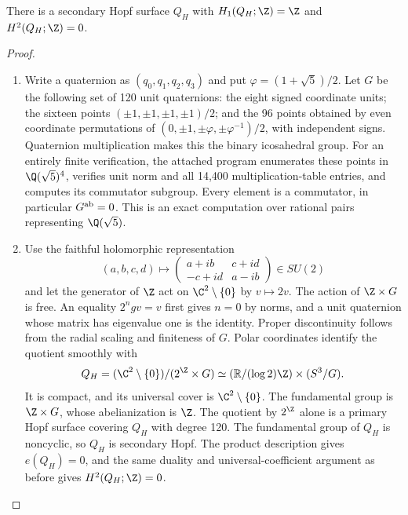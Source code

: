 \begin{proposition}\hypertarget{tag-01F9}{}\label{cdp:st:C.3.3}


There is a secondary Hopf surface $Q_H$ with
$H_1(Q_H;\Z)=\Z$ and $H^2(Q_H;\Z)=0$.
\end{proposition}


\begin{proof}

\begin{enumerate}[label={$\langle1\rangle$\arabic*.},leftmargin=*]
\item Write a quaternion as $(q_0,q_1,q_2,q_3)$ and put
$\varphi=(1+\sqrt5)/2$. Let $G$ be the following set of 120 unit
quaternions: the eight signed coordinate units; the sixteen points
$(\pm1,\pm1,\pm1,\pm1)/2$; and the 96 points obtained by even
coordinate permutations of
$(0,\pm1,\pm\varphi,\pm\varphi^{-1})/2$, with independent signs.
Quaternion multiplication makes this the binary icosahedral group.
For an entirely finite verification, the attached program enumerates
these points in $\Q(\sqrt5)^4$, verifies unit norm and all 14,400
multiplication-table entries, and computes its commutator subgroup.
Every element is a commutator, in particular $G^{\rm ab}=0$.
This is an exact computation over rational pairs representing
$\Q(\sqrt5)$.

\item Use the faithful holomorphic representation
\[
(a,b,c,d)\longmapsto
\begin{pmatrix}a+ib&c+id\\-c+id&a-ib\end{pmatrix}\in SU(2)
\]
and let the generator of $\Z$ act on $\C^2\setminus\{0\}$ by
$v\mapsto2v$. The action of $\Z\times G$ is free. An equality
$2^ngv=v$ first gives $n=0$ by norms, and a unit quaternion whose
matrix has eigenvalue one is the identity. Proper discontinuity
follows from the radial scaling and finiteness of $G$.
Polar coordinates identify the quotient smoothly with
\[
Q_H=(\C^2\setminus\{0\})/(2^{\Z}\times G)
\simeq (\mathbb R/(\log2)\Z)\times(S^3/G).
\]
It is compact, and its universal cover is $\C^2\setminus\{0\}$.
The fundamental group is $\Z\times G$, whose abelianization is
$\Z$. The quotient by $2^{\Z}$ alone is a primary Hopf surface
covering $Q_H$ with degree 120. The fundamental group of $Q_H$ is
noncyclic, so $Q_H$ is secondary Hopf. The product description gives
$e(Q_H)=0$, and the same duality and universal-coefficient argument
as before gives $H^2(Q_H;\Z)=0$.

\end{enumerate}
\end{proof}